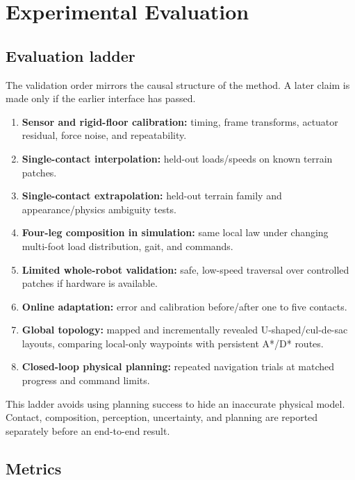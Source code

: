 \section{Experimental Evaluation}
\label{sec:evaluation}

\subsection{Evaluation ladder}

The validation order mirrors the causal structure of the method. A later claim is made only if the earlier interface has passed.

\begin{enumerate}
  \item \textbf{Sensor and rigid-floor calibration:} timing, frame transforms, actuator residual, force noise, and repeatability.
  \item \textbf{Single-contact interpolation:} held-out loads/speeds on known terrain patches.
  \item \textbf{Single-contact extrapolation:} held-out terrain family and appearance/physics ambiguity tests.
  \item \textbf{Four-leg composition in simulation:} same local law under changing multi-foot load distribution, gait, and commands.
  \item \textbf{Limited whole-robot validation:} safe, low-speed traversal over controlled patches if hardware is available.
  \item \textbf{Online adaptation:} error and calibration before/after one to five contacts.
  \item \textbf{Global topology:} mapped and incrementally revealed U-shaped/cul-de-sac layouts, comparing local-only waypoints with persistent A*/D* routes.
  \item \textbf{Closed-loop physical planning:} repeated navigation trials at matched progress and command limits.
\end{enumerate}

This ladder avoids using planning success to hide an inaccurate physical model. Contact, composition, perception, uncertainty, and planning are reported separately before an end-to-end result.

\subsection{Metrics}

